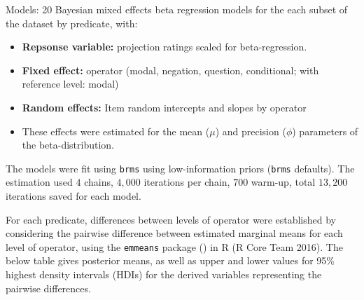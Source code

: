 \documentclass[a4paper,12pt,twoside]{article}
\begin{document}
    Models: 20 Bayesian mixed effects beta regression models for the each subset of the dataset by predicate, with:
    \begin{itemize}
        \item \textbf{Repsonse variable:} projection ratings scaled for beta-regression.
        
        \item \noindent\textbf{Fixed effect:} operator (modal, negation, question, conditional; with reference level: modal)
        
        \item \textbf{Random effects:} Item random intercepts and slopes by operator %

        \item These effects were estimated for the mean ($\mu$) and precision ($\phi$) parameters of the beta-distribution.
        
    \end{itemize}

    \noindent The models were fit using \texttt{brms}
    using low-information priors (\texttt{brms} defaults). The estimation used $4$ chains, $4,000$ iterations per chain, $700$ warm-up, total $13,200$ iterations saved for each model.
        
    For each predicate, differences between levels of operator were established by considering the pairwise difference between estimated marginal means for each level of operator, using the \texttt{emmeans} package (\citealt{lenth_emmeans_2024}) in R (R Core Team 2016). The below table gives posterior means, as well as upper and lower values for 95\% highest density intervals (HDIs) for the derived variables representing the pairwise differences.
\end{document}
